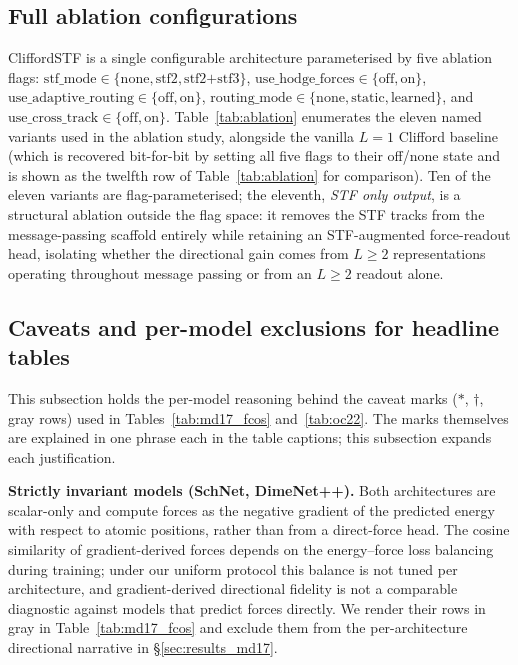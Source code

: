 \subsection{Full ablation configurations}\label{supp:variants}

CliffordSTF is a single configurable architecture parameterised by five ablation flags: $\mathrm{stf\_mode} \in \{\text{none}, \text{stf2}, \text{stf2+stf3}\}$, $\mathrm{use\_hodge\_forces} \in \{\text{off}, \text{on}\}$, $\mathrm{use\_adaptive\_routing} \in \{\text{off}, \text{on}\}$, $\mathrm{routing\_mode} \in \{\text{none}, \text{static}, \text{learned}\}$, and $\mathrm{use\_cross\_track} \in \{\text{off}, \text{on}\}$. Table~\ref{tab:ablation} enumerates the eleven named variants used in the ablation study, alongside the vanilla $L{=}1$ Clifford baseline (which is recovered bit-for-bit by setting all five flags to their off/none state and is shown as the twelfth row of Table~\ref{tab:ablation} for comparison). Ten of the eleven variants are flag-parameterised; the eleventh, \emph{STF only output}, is a structural ablation outside the flag space: it removes the STF tracks from the message-passing scaffold entirely while retaining an STF-augmented force-readout head, isolating whether the directional gain comes from $L\!\geq\!2$ representations operating throughout message passing or from an $L\!\geq\!2$ readout alone.


\subsection{Caveats and per-model exclusions for headline tables}\label{supp:results_caveats}

This subsection holds the per-model reasoning behind the caveat marks ($\ast$, $\dagger$, gray rows) used in Tables~\ref{tab:md17_fcos} and~\ref{tab:oc22}. The marks themselves are explained in one phrase each in the table captions; this subsection expands each justification.

\textbf{Strictly invariant models (SchNet, DimeNet++).} Both architectures are scalar-only and compute forces as the negative gradient of the predicted energy with respect to atomic positions, rather than from a direct-force head. The cosine similarity of gradient-derived forces depends on the energy--force loss balancing during training; under our uniform protocol this balance is not tuned per architecture, and gradient-derived directional fidelity is not a comparable diagnostic against models that predict forces directly. We render their rows in gray in Table~\ref{tab:md17_fcos} and exclude them from the per-architecture directional narrative in \S\ref{sec:results_md17}.

